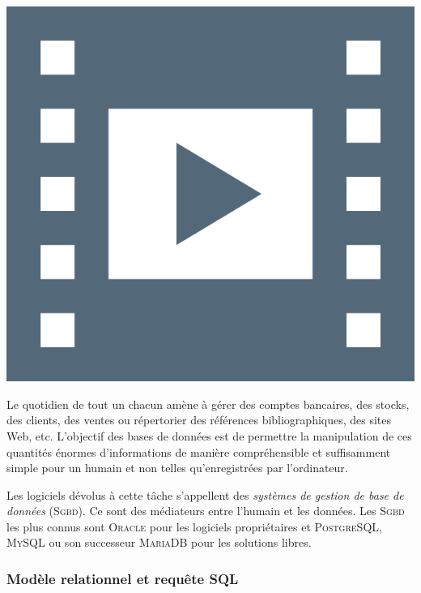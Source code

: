 \begin{marginvideo}[\label{vid:vidV.5}Base de données.]%
	\href{https://www.youtube.com/watch?v=T0ddDXypoz0}%
	  {\includegraphics[width=\marginparwidth]{./Images/Pictograms/film-strip-dark-electric-blue.png}}%
\end{marginvideo}

Le quotidien de tout un chacun amène à gérer des comptes bancaires, des stocks, des clients, des ventes ou répertorier des références bibliographiques, des sites Web, etc. L'objectif des bases de données est de permettre la manipulation de ces quantités énormes d'informations de manière compréhensible et suffisamment simple pour un humain et non telles qu'enregistrées par l'ordinateur.

Les logiciels dévolus à cette tâche s'appellent des \emph{systèmes de gestion de base de données} (\textsc{Sgbd}). Ce sont des médiateurs entre l'humain et les données. Les \textsc{Sgbd} les plus connus sont \textsc{Oracle} pour les logiciels propriétaires et \textsc{PostgreSQL}, \textsc{MySQL} ou son successeur \textsc{MariaDB} pour les solutions libres.



\subsubsection[Modèle relationnel et requête SQL]{Modèle relationnel et requête SQL}
\label{subsub:V.3.3.1}

